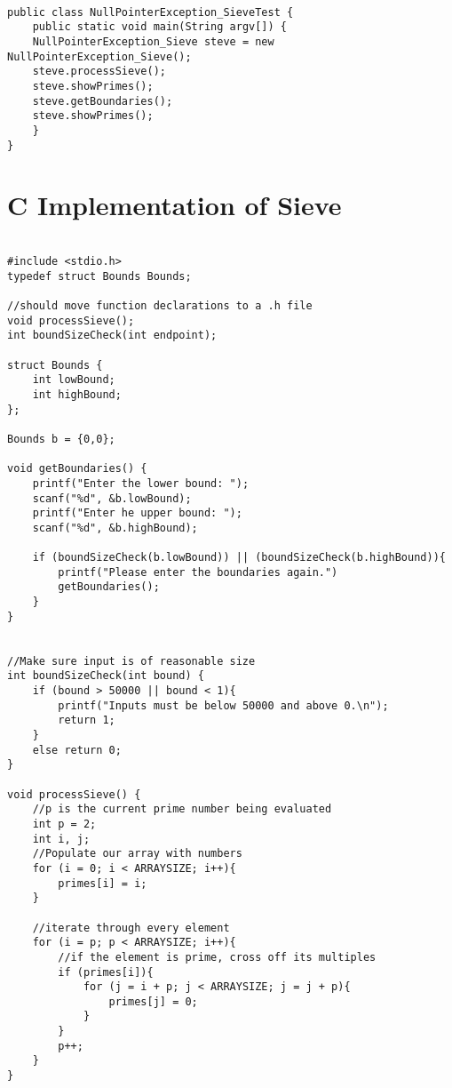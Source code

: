 \documentclass[a4paper,11pt]{article}
\begin{document}
\begin{lstlisting}

public class NullPointerException_SieveTest { 
	public static void main(String argv[]) { 
	NullPointerException_Sieve steve = new NullPointerException_Sieve(); 
	steve.processSieve(); 
	steve.showPrimes(); 
	steve.getBoundaries(); 
	steve.showPrimes(); 
	} 
}

\end{lstlisting}


\section{C Implementation of Sieve}

\begin{lstlisting}

#include <stdio.h> 
typedef struct Bounds Bounds; 
 
//should move function declarations to a .h file 
void processSieve(); 
int boundSizeCheck(int endpoint); 
 
struct Bounds { 
    int lowBound; 
    int highBound; 
}; 
 
Bounds b = {0,0}; 
 
void getBoundaries() { 
    printf("Enter the lower bound: "); 
    scanf("%d", &b.lowBound); 
    printf("Enter he upper bound: "); 
    scanf("%d", &b.highBound); 
     
    if (boundSizeCheck(b.lowBound)) || (boundSizeCheck(b.highBound)){ 
        printf("Please enter the boundaries again.") 
        getBoundaries(); 
    } 
} 
 
 
//Make sure input is of reasonable size 
int boundSizeCheck(int bound) { 
    if (bound > 50000 || bound < 1){ 
        printf("Inputs must be below 50000 and above 0.\n"); 
        return 1; 
    } 
    else return 0; 
} 
 
void processSieve() { 
    //p is the current prime number being evaluated 
    int p = 2; 
    int i, j; 
    //Populate our array with numbers 
    for (i = 0; i < ARRAYSIZE; i++){ 
        primes[i] = i;  
    } 
 
    //iterate through every element 
    for (i = p; p < ARRAYSIZE; i++){ 
        //if the element is prime, cross off its multiples 
        if (primes[i]){ 
            for (j = i + p; j < ARRAYSIZE; j = j + p){ 
                primes[j] = 0; 
            } 
        } 
        p++; 
    } 
}

\end{lstlisting}

\end{document}

